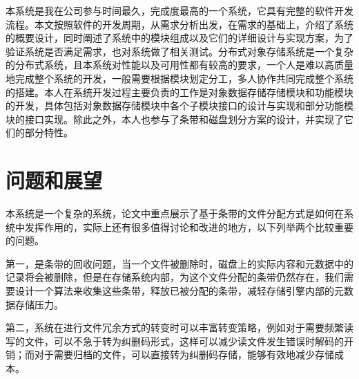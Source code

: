 本系统是我在公司参与时间最久，完成度最高的一个系统，它具有完整的软件开发流程。本文按照软件的开发周期，从需求分析出发，在需求的基础上，介绍了系统的概要设计，同时阐述了系统中的模块组成以及它们的详细设计与实现方案，为了验证系统是否满足需求，也对系统做了相关测试。分布式对象存储系统是一个复杂的分布式系统，且本系统对性能以及可用性都有较高的要求，一个人是难以高质量地完成整个系统的开发，一般需要根据模块划定分工，多人协作共同完成整个系统的搭建。本人在系统开发过程主要负责的工作是对象数据存储存储模块和功能模块的开发，具体包括对象数据存储模块中各个子模块接口的设计与实现和部分功能模块的接口实现。除此之外，本人也参与了条带和磁盘划分方案的设计，并实现了它们的部分特性。

\section{问题和展望}%
本系统是一个复杂的系统，论文中重点展示了基于条带的文件分配方式是如何在系统中发挥作用的，实际上还有很多值得讨论和改进的地方，以下列举两个比较重要的问题。

第一，是条带的回收问题，当一个文件被删除时，磁盘上的实际内容和元数据中的记录将会被删除，但是在存储系统内部，为这个文件分配的条带仍然存在，我们需要设计一个算法来收集这些条带，释放已被分配的条带，减轻存储引擎内部的元数据存储压力。

第二，系统在进行文件冗余方式的转变时可以丰富转变策略，例如对于需要频繁读写的文件，可以不急于转为纠删码形式，这样可以减少读文件发生错误时解码的开销；而对于需要归档的文件，可以直接转为纠删码存储，能够有效地减少存储成本。
